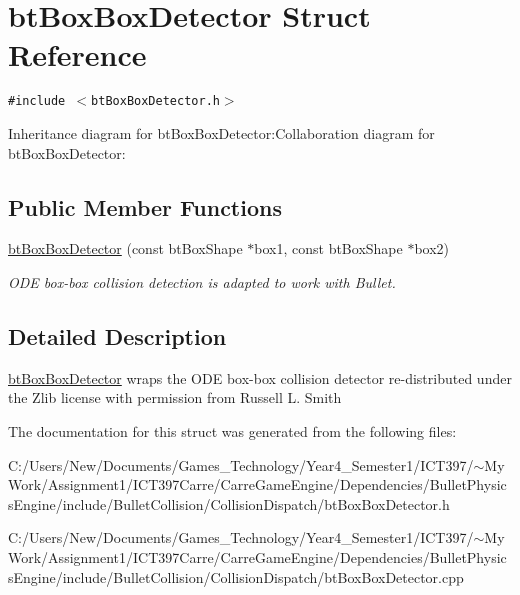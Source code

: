 \hypertarget{structbt_box_box_detector}{
\section{btBoxBoxDetector Struct Reference}
\label{structbt_box_box_detector}
}
{\tt \#include $<$btBoxBoxDetector.h$>$}

Inheritance diagram for btBoxBoxDetector:Collaboration diagram for btBoxBoxDetector:\subsection*{Public Member Functions}
\begin{CompactItemize}
\item 
\hypertarget{structbt_box_box_detector_9ab1be9748aeb7cfceb274768910c895}{
\hyperlink{structbt_box_box_detector_9ab1be9748aeb7cfceb274768910c895}{btBoxBoxDetector} (const btBoxShape $\ast$box1, const btBoxShape $\ast$box2)}
\label{structbt_box_box_detector_9ab1be9748aeb7cfceb274768910c895}

\begin{CompactList}\small\item\em ODE box-box collision detection is adapted to work with Bullet. \item\end{CompactList}\end{CompactItemize}


\subsection{Detailed Description}
\hyperlink{structbt_box_box_detector}{btBoxBoxDetector} wraps the ODE box-box collision detector re-distributed under the Zlib license with permission from Russell L. Smith 

The documentation for this struct was generated from the following files:\begin{CompactItemize}
\item 
C:/Users/New/Documents/Games\_\-Technology/Year4\_\-Semester1/ICT397/$\sim$My Work/Assignment1/ICT397Carre/CarreGameEngine/Dependencies/BulletPhysicsEngine/include/BulletCollision/CollisionDispatch/btBoxBoxDetector.h\item 
C:/Users/New/Documents/Games\_\-Technology/Year4\_\-Semester1/ICT397/$\sim$My Work/Assignment1/ICT397Carre/CarreGameEngine/Dependencies/BulletPhysicsEngine/include/BulletCollision/CollisionDispatch/btBoxBoxDetector.cpp\end{CompactItemize}
